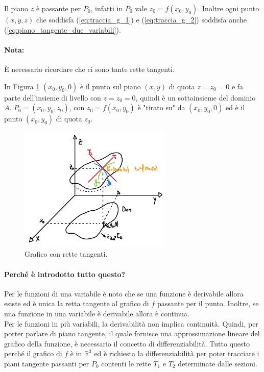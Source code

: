 Il piano $z$ è passante per $P_0$, infatti in $P_0$ vale $z_0=f(x_0,y_0)$. Inoltre ogni punto $(x,y,z)$ che soddisfa (\ref{eq:traccia_g_1}) e (\ref{eq:traccia_g_2}) soddisfa anche (\ref{eq:piano_tangente_due_variabili}).
 
\paragraph{Nota:} È necessario ricordare che ci sono tante rette tangenti.

In Figura \ref{fig:grafico_f_R3_osservazione} $(x_0,y_0,0)$ è il punto sul piano $(x,y)$ di quota $z=z_0=0$ e fa parte dell'insieme di livello con $z=z_0=0$, quindi è un sottoinsieme del dominio $A$. $P_0=(x_0,y_0,z_0)$, con $z_0=f(x_0,y_0)$ è "tirato su" da $(x_0,y_0,0)$ ed è il punto $(x_0,y_0)$ di quota $z_0$.

\begin{figure}[ht]
    \centering
    \includegraphics[width=0.65\textwidth]{Analisi2/figures/grafico_f_R3_osservazione.png}
    \caption{Grafico con rette tangenti.}\label{fig:grafico_f_R3_osservazione}
\end{figure}

\paragraph{Perché è introdotto tutto questo?} Per le funzioni di una variabile è noto che se una funzione è derivabile allora esiste ed è unica la retta tangente al grafico di $f$ passante per il punto. Inoltre, se una funzione in una variabile è derivabile allora è continua.\\
Per le funzioni in più variabili, la derivabilità non implica continuità. Quindi, per porter parlare di piano tangente, il quale fornisce una approssimazione lineare del grafico della funzione, è necessario il concetto di differenziabilità. Tutto questo perché il grafico di $f$ è in $\mathbb{R}^3$ ed è richiesta la differenziabilità per poter tracciare i piani tangente passanti per $P_0$ contenti le rette $T_1$ e $T_2$ determinate dalle sezioni.

